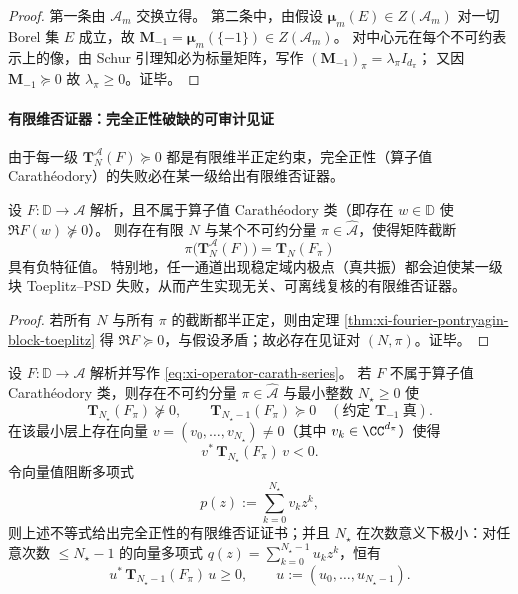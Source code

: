 \begin{proof}
第一条由 \(\mathcal{A}_m\) 交换立得。
第二条中，由假设 \(\boldsymbol\mu_m(E)\in Z(\mathcal{A}_m)\) 对一切 Borel 集 \(E\) 成立，故 \(\mathbf{M}_{-1}=\boldsymbol\mu_m(\{-1\})\in Z(\mathcal{A}_m)\)。
对中心元在每个不可约表示上的像，由 Schur 引理知必为标量矩阵，写作 \((\mathbf{M}_{-1})_\pi=\lambda_\pi I_{d_\pi}\)；
又因 \(\mathbf{M}_{-1}\succeq 0\) 故 \(\lambda_\pi\ge 0\)。证毕。
\end{proof}

\paragraph{有限维否证器：完全正性破缺的可审计见证}
由于每一级 \(\mathbf{T}^{\mathcal{A}}_N(F)\succeq 0\) 都是有限维半正定约束，完全正性（算子值 Carath\'eodory）的失败必在某一级给出有限维否证器。

\begin{corollary}[完全正性破缺 \texorpdfstring{$\Rightarrow$}{=>} 有限阶块负惯性]\label{cor:xi-cp-breakdown-finite-witness}
设 \(F:\mathbb{D}\to\mathcal{A}\) 解析，且不属于算子值 Carath\'eodory 类（即存在 \(w\in\mathbb{D}\) 使 \(\Re F(w)\nsucceq 0\)）。
则存在有限 \(N\) 与某个不可约分量 \(\pi\in\widehat{\mathcal{A}}\)，使得矩阵截断
\[
\pi\!\bigl(\mathbf{T}^{\mathcal{A}}_N(F)\bigr)=\mathbf{T}_N(F_\pi)
\]
具有负特征值。
特别地，任一通道出现稳定域内极点（真共振）都会迫使某一级块 Toeplitz--PSD 失败，从而产生实现无关、可离线复核的有限维否证器。
\end{corollary}

\begin{proof}
若所有 \(N\) 与所有 \(\pi\) 的截断都半正定，则由定理 \ref{thm:xi-fourier-pontryagin-block-toeplitz} 得 \(\Re F\succeq 0\)，与假设矛盾；故必存在见证对 \((N,\pi)\)。证毕。
\end{proof}

\begin{proposition}\label{prop:xi-toeplitz-first-failure-minimal-blocking-polynomial}
设 \(F:\mathbb{D}\to\mathcal{A}\) 解析并写作 \eqref{eq:xi-operator-carath-series}。
若 \(F\) 不属于算子值 Carath\'eodory 类，则存在不可约分量 \(\pi\in\widehat{\mathcal{A}}\) 与最小整数 \(N_\star\ge 0\) 使
\[
\mathbf{T}_{N_\star}(F_\pi)\nsucceq 0,
\qquad
\mathbf{T}_{N_\star-1}(F_\pi)\succeq 0
\quad(\text{约定 }\mathbf{T}_{-1}\ \text{真}).
\]
在该最小层上存在向量 \(v=(v_0,\dots,v_{N_\star})\neq 0\)（其中 \(v_k\in\CC^{d_\pi}\)）使得
\[
v^\ast\,\mathbf{T}_{N_\star}(F_\pi)\,v<0.
\]
令向量值阻断多项式
\[
p(z):=\sum_{k=0}^{N_\star} v_k z^k,
\]
则上述不等式给出完全正性的有限维否证证书；并且 \(N_\star\) 在次数意义下极小：对任意次数 \(\le N_\star-1\) 的向量多项式 \(q(z)=\sum_{k=0}^{N_\star-1}u_k z^k\)，恒有
\[
u^\ast\,\mathbf{T}_{N_\star-1}(F_\pi)\,u\ge 0,
\qquad
u:=(u_0,\dots,u_{N_\star-1}).
\]
\end{proposition}

